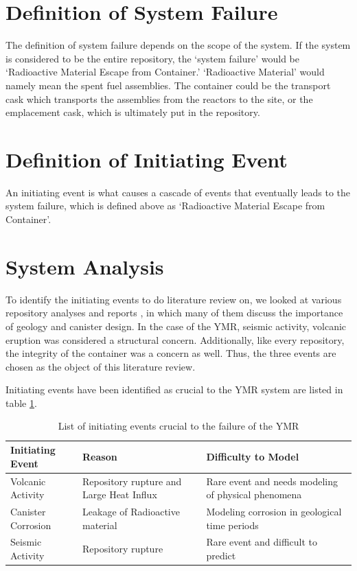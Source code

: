 \documentclass[12pt]{article}
\begin{document}
\section{Definition of System Failure}
The definition of system failure depends on the scope of the system.
If the system is considered to be the entire repository, the `system failure' would be
`Radioactive Material Escape from Container.'
`Radioactive Material' would namely mean the spent fuel assemblies.
The container could be the transport cask which transports the assemblies from
the reactors to the site, or the emplacement cask, which is ultimately put in the repository.


\section{Definition of Initiating Event}
An initiating event is what causes a cascade of events that eventually leads
to the system failure, which is defined above as `Radioactive Material Escape
from Container'. 


\section{System Analysis}
To identify the initiating events to do literature review on,
we looked at various repository analyses and reports \cite{u.s._department_of_energy_office_of_civilian_radioactive_waste_management_national_2008, wilson_total-system_1994, rechard_evolution_2014, u.s._department_of_energy_yucca_2002},
in which many of them discuss the importance of geology and canister design.
In the case of the \gls{YMR}, seismic activity, volcanic eruption was considered
a structural concern. Additionally, like every repository, the integrity
of the container was a concern as well. Thus, the three events are chosen
as the object of this literature review.

Initiating events have been identified as crucial to the 
\gls{YMR} system are listed in table \ref{tab:ie}.
\begin{table}[h]
    \centering
        \begin{tabularx}{\linewidth}{mbb}
            \hline
            \textbf{Initiating Event} & \textbf{Reason} & \textbf{Difficulty to Model} \\ \hline
            \small{Volcanic Activity} & Repository rupture and Large Heat Influx & Rare event and needs modeling of physical phenomena \cite{marzocchi_quantifying_2004} \\ 
            \small{Canister Corrosion} & Leakage of Radioactive material & Modeling corrosion in geological time periods \cite{sadiqp_robabilistic_2004, oldenburg_low-probability_2016} \\
            \small{Seismic Activity} & Repository rupture & Rare event and difficult to predict \cite{ward_multidisciplinary_1994} \\ \hline
        \end{tabularx}
        \caption{List of initiating events crucial to the failure of the \gls{YMR}}
        \label{tab:ie}
\end {table}
\end{document}
